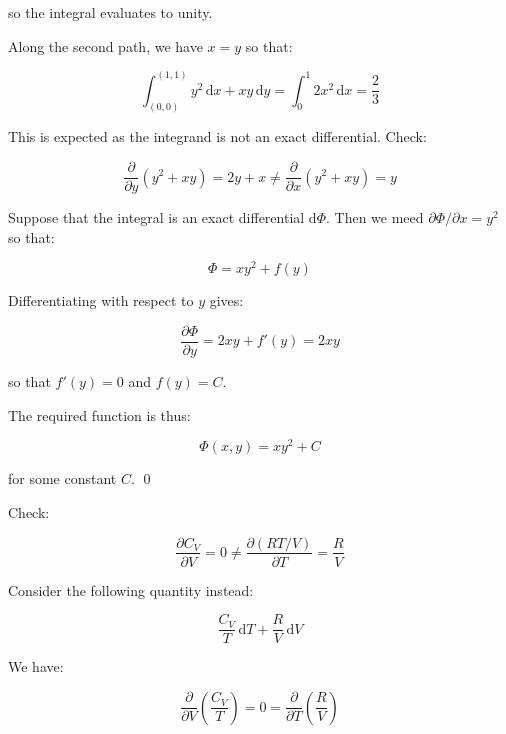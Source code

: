 \documentclass[12pt]{article}
\begin{document}
so the integral evaluates to unity.

Along the second path, we have $x = y$ so that:

\begin{equation}
    \int_{(0, 0)}^{(1, 1)} y^{2} \, \mathrm{d}x + xy \, \mathrm{d}y = \int_{0}^{1} 2x^{2} \, \mathrm{d}x = \frac{2}{3}
\end{equation}

This is expected as the integrand is not an exact differential. Check:

\begin{equation}
    \frac{\partial}{\partial y} (y^{2} + xy) = 2y + x \neq \frac{\partial}{\partial x} (y^{2} + xy) = y
\end{equation}

Suppose that the integral is an exact differential $\mathrm{d}\Phi$. Then we meed $\partial \Phi/\partial x = y^{2}$ so that:

\begin{equation}
    \Phi = xy^{2} + f(y)
\end{equation}

Differentiating with respect to $y$ gives:

\begin{equation}
    \frac{\partial \Phi}{\partial y} = 2xy + f'(y) = 2xy
\end{equation}

so that $f'(y) = 0$ and $f(y) = C$.

The required function is thus:

\begin{equation}
    \Phi(x, y) = xy^{2} + C
\end{equation}

for some constant $C$.
\qed


Check:

\begin{equation}
    \frac{\partial C_{V}}{\partial V} = 0 \ne \frac{\partial (RT/V)}{\partial T} = \frac{R}{V}
\end{equation}

Consider the following quantity instead:

\begin{equation}
    \frac{C_{V}}{T} \, \mathrm{d}T + \frac{R}{V} \, \mathrm{d}V
\end{equation}

We have:

\begin{equation}
    \frac{\partial}{\partial V} \left( \frac{C_{V}}{T} \right) = 0 = \frac{\partial}{\partial T} \left( \frac{R}{V} \right)
\end{equation}
\end{document}
